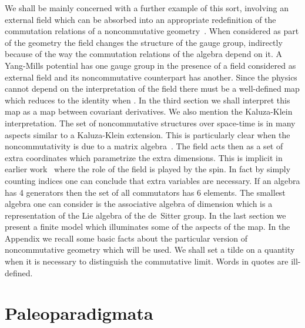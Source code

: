 \documentclass[a4paper,12pt]{article}
\def\h#1{\hat #1}
\providecommand{\initiate}{\setcounter{equation}{0}}
\begin{document}
We shall be mainly concerned with a further example of this sort,
involving an external field \coordHE{} which can be absorbed into an
appropriate redefinition of the commutation relations of a
noncommutative geometry~\cite{Sch99}.  When considered as part of the
geometry the field \coordHE{} changes the structure of the gauge group,
indirectly because of the way the commutation relations of the algebra
depend on it. A Yang-Mills potential \coordHE{} has one gauge group in the
presence of a \coordHE{} field considered as external field and its
noncommutative counterpart \myHighlight{$\h{A}$}\coordHE{} has another. Since the physics
cannot depend on the interpretation of the field there must be a
well-defined map \myHighlight{$\h{A} = \h{A}(A,B)$}\coordHE{} which reduces to the identity
when \coordHE{}. In the third section we shall interpret this map as a map
between covariant derivatives. We also mention the Kaluza-Klein
interpretation. The set of noncommutative structures over space-time
is in many aspects similar to a Kaluza-Klein extension. This is
particularly clear when the noncommutativity is due to a matrix
algebra~\cite{Mad89c}. The \coordHE{} field acts then as a set of extra
coordinates which parametrize the extra dimensions. This is implicit
in earlier work~\cite{Sny47a,Mad89c} where the role of the \coordHE{} field is
played by the spin. In fact by simply counting indices one can
conclude that extra variables are necessary. If an algebra has 4
generators then the set of all commutators has 6 elements. The
smallest algebra one can consider is the associative algebra of
dimension \coordHE{} which is a representation of the Lie algebra of the
de~Sitter group. In the last section we present a finite model which
illuminates some of the aspects of the map. In the Appendix we recall
some basic facts about the particular version of noncommutative
geometry which will be used.  We shall set a tilde on a quantity when
it is necessary to distinguish the commutative limit.  Words in quotes
are ill-defined.


\initiate
\section{Paleoparadigmata}   
\end{document}

